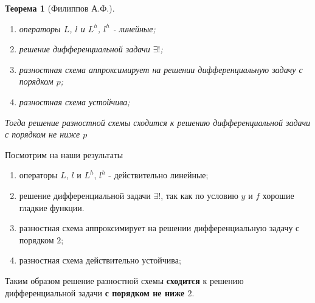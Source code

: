 \documentclass[12pt]{article}
\newtheorem*{theorem}{Теорема}
\begin{document}
\begin{enumerate}[I.]
\begin{theorem}[Филиппов А.Ф.]
            \begin{enumerate}
                \item операторы $L$, $l$ и $L^h$, $l^h$ - линейные;
                \item решение дифференциальной задачи $\exists!$;
                \item разностная схема аппроксимирует на решении дифференциальную задачу с порядком $p$;
                \item разностная схема устойчива;
            \end{enumerate}
            Тогда решение разностной схемы сходится к решению дифференциальной задачи с порядком не ниже $p$
        \end{theorem}
        Посмотрим на наши результаты
        \begin{enumerate}
            \item операторы $L$, $l$ и $L^h$, $l^h$ - действительно линейные;
            \item решение дифференциальной задачи $\exists!$, так как по условию $y$ и $f$ хорошие гладкие функции.
            \item разностная схема аппроксимирует на решении дифференциальную задачу с порядком $2$;
            \item разностная схема действительно устойчива;
        \end{enumerate}
        Таким образом решение разностной схемы \textbf{сходится} к решению дифференциальной задачи \textbf{с порядком не ниже $2$}.

        \newpage


\end{enumerate}
\end{document}
